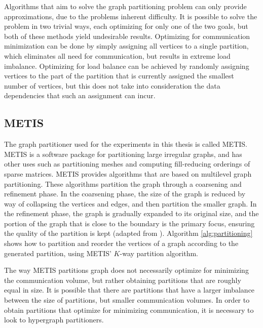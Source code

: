 Algorithms that aim to solve the graph partitioning problem can only provide approximations, due to the problems inherent difficulty. It is possible to solve the problem in two trivial ways, each optimizing for only one of the two goals, but both of these methods yield undesirable results. Optimizing for communication minimization can be done by simply assigning all vertices to a single partition, which eliminates all need for communication, but results in extreme load imbalance. Optimizing for load balance can be achieved by randomly assigning vertices to the part of the partition that is currently assigned the smallest number of vertices, but this does not take into consideration the data dependencies that such an assignment can incur.

\subsection{METIS}
The graph partitioner used for the experiments in this thesis is called METIS. METIS is a software package for partitioning large irregular graphs, and has other uses such as partitioning meshes and computing fill-reducing orderings of sparse matrices. METIS provides algorithms that are based on multilevel graph partitioning. These algorithms partition the graph through a coarsening and refinement phase. In the coarsening phase, the size of the graph is reduced by way of collapsing the vertices and edges, and then partition the smaller graph. In the refinement phase, the graph is gradually expanded to its original size, and the portion of the graph that is close to the boundary is the primary focus, ensuring the quality of the partition is kept (adapted from \cite{karypis1997metis}). Algorithm \ref{alg:partitioning} shows how to partition and reorder the vertices of a graph according to the generated partition, using METIS' \(K\)-way partition algorithm.
\medskip

The way METIS partitions graph does not necessarily optimize for minimizing the communication volume, but rather obtaining partitions that are roughly equal in size. It is possible that there are partitions that have a larger imbalance between the size of partitions, but smaller communication volumes. In order to obtain partitions that optimize for minimizing communication, it is necessary to look to hypergraph partitioners.

